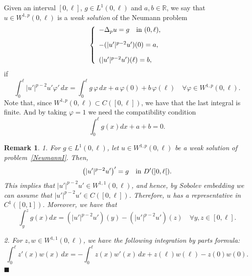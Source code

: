 \documentclass[reqno,12pt]{amsart}
\newtheorem{remark}[theorem]{Remark}
\numberwithin{equation}{section} %
\begin{document}
Given an interval $[0, \ell]$,  $g\in L^1(0,\ell)$  and $a,b\in \mathbb{R}$, we say that $u \in W^{1,p}(0,\ell)$ is a {\it weak solution} of the Neumann problem 
 \begin{equation}\label{NeumannI}
 \left\{ \begin{array}{ll}  -\Delta_pu = g \quad \hbox{in} \ (0,\ell), 
 \\[10pt]  -(\vert u' \vert^{p-2} u')(0) = a, 
  \\[10pt]  (\vert u' \vert^{p-2} u')(\ell) =b,
 \end{array} \right.
 \end{equation}
 if
 \begin{equation}\label{weakform}
\int_0^\ell |u'|^{p-2}u' \varphi'\,dx
= \int_0^\ell g\,\varphi\,dx
+ a\,\varphi(0)+b\,\varphi(\ell)
\quad
\forall \varphi\in W^{1,p}(0,\ell).
\end{equation}
Note that, since $W^{1,p}(0, \ell) \subset C([0, \ell])$, we have that the last integral is finite. And by taking $\varphi=1$ we need the compatibility condition
 $$\int_0^\ell g(x)dx+a+b=0.$$



  
 \begin{remark}\label{regularity}\rm  1. For $g\in L^1(0,\ell)$,  let $u\in W^{1,p}(0,\ell)$ be a  weak solution
 of problem~\eqref{NeumannI}. Then, $$\left(|u'|^{p-2}u'\right)'=g\quad\hbox{in } D'(]0,\ell[).$$ This implies that 
$
|u'|^{p-2}u' \in W^{1,1}(0,\ell)$, and hence, by Sobolev embedding we can assume that $|u'|^{p-2}u'\in C([0,\ell])$. 
Therefore, $u$ has a representative in $C^1([0,1])$.  
Moreover, we have that
$$\int_y^zg(x)dx=(|u'|^{p-2}u')(y)-(|u'|^{p-2}u')(z)\quad\forall y,z\in[0,\ell].$$

2. For $z,w \in W^{1,1}(0,\ell)$, we   have the following integration by parts formula:
\begin{equation}\label{IPR}
\int_0^\ell z'(x)  w(x) \, dx = - \int_0^\ell z(x)  w'(x) \, dx + z(\ell)w(\ell) - z(0) w(0).
\end{equation}
\hfill$\blacksquare$
\end{remark}
 
  
\end{document}
